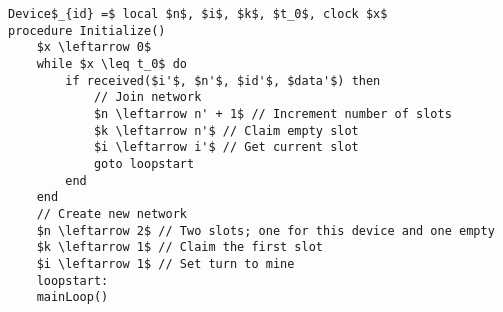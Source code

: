 \begin{minipage}{\linewidth} %
\begin{lstlisting}[label=lst:setupCCRC,style=pseudocode,mathescape=true,caption={Pseudocode example of the special case procedure Initialize()},basicstyle=\ttfamily]
Device$_{id} =$ local $n$, $i$, $k$, $t_0$, clock $x$
procedure Initialize()
    $x \leftarrow 0$
    while $x \leq t_0$ do
        if received($i'$, $n'$, $id'$, $data'$) then
            // Join network
            $n \leftarrow n' + 1$ // Increment number of slots
            $k \leftarrow n'$ // Claim empty slot
            $i \leftarrow i'$ // Get current slot
            goto loopstart
        end
    end
    // Create new network
    $n \leftarrow 2$ // Two slots; one for this device and one empty
    $k \leftarrow 1$ // Claim the first slot
    $i \leftarrow 1$ // Set turn to mine
    loopstart:
    mainLoop()
\end{lstlisting}   
\end{minipage}
